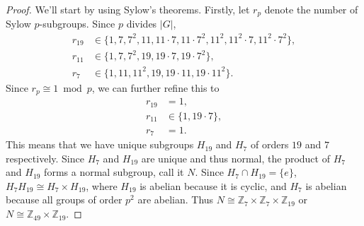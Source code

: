 \documentclass{article}
\newcommand{\Z}{\mathbb Z}
\newcommand{\set}[1]{\{#1\}}
\begin{document}
\begin{proof}
  We'll start by using Sylow's theorems.
  Firstly, let $r_p$ denote the number of Sylow $p$-subgroups.
  Since $p$ divides $|G|$, \begin{align*}
    r_{19} &\in \set{1, 7, 7^2, 11, 11\cdot7, 11\cdot7^2, 11^2, 11^2\cdot7,  11^2\cdot7^2}, \\
    r_{11} &\in \set{1, 7, 7^2, 19, 19\cdot7, 19\cdot7^2}, \\
    r_7  &\in \set{1, 11, 11^2, 19, 19\cdot11, 19\cdot11^2}.
  \end{align*}
  Since $r_p \cong 1 \bmod p$, we can further refine this to \begin{align*}
    r_{19} &= 1, \\
    r_{11} &\in \set{1, 19\cdot7}, \\
    r_7  &= 1.
  \end{align*}
  This means that we have unique subgroups $H_{19}$ and $H_7$ of orders
  $19$ and $7$ respectively. Since $H_7$ and $H_{19}$ are unique and thus normal,
  the product of $H_7$ and $H_{19}$ forms a normal subgroup, call it $N$.
  Since $H_7 \cap H_{19} = \set{e}$, $H_7H_{19} \cong H_7 \times H_{19}$,
  where $H_{19}$ is abelian because it is cyclic, and $H_7$ is abelian because all
  groups of order $p^2$ are abelian. Thus
  $N \cong \Z_7 \times \Z_7 \times \Z_{19}$ or $N \cong \Z_{49} \times \Z_{19}$.


\end{proof}
\end{document}
